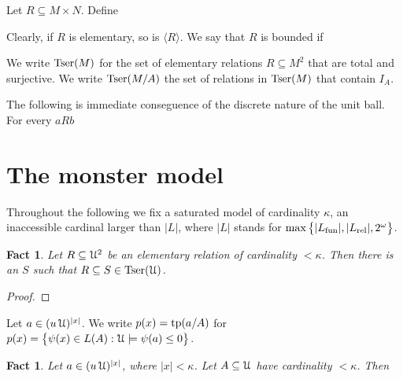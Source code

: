 \documentclass[12pt,letterpaper,oneside,reqno]{amsart}
\theoremstyle{plain}
\newtheorem{fact}[theorem]{Fact}
\theoremstyle{remark}
\renewcommand*{\emph}[1]{%
   \smash{\tikz[baseline]\node[rectangle, fill=olive!25, rounded corners, inner xsep=0.5ex, inner ysep=0.2ex, anchor=base, minimum height = 2.7ex]{#1};}}
\begin{document}
Let $R\subseteq M\times N$.
Define


Clearly, if $R$ is elementary, so is $\langle R\rangle$.
We say that $R$ is bounded if


We write ${\rm Tser}(M)$ for the set of elementary relations $R\subseteq M^2$ that are total and surjective.
We write  ${\rm Tser}(M/A)$ the set of relations in ${\rm Tser}(M)$ that contain $I_A$.

The following is immediate conseguence of the discrete nature of the unit ball.
For every $aRb$






\section{The monster model}

Throughout the following we fix a saturated model \emph{$\EuScript U$\/} of cardinality $\kappa$, an inaccessible cardinal larger than $|L|$, where $|L|$ stands for $\max\big\{|L_{\rm fun}|,|L_{\rm rel}|,2^\omega\big\}$.

\begin{fact}
  Let $R\subseteq{\EuScript U}^2$ be an elementary relation of cardinality $<\kappa$.
  Then there is an  $S$ such that $R\subseteq S\in{\rm Tser}({\EuScript U})$.
\end{fact}

\begin{proof}
  
\end{proof}

Let $a\in(u\,{\EuScript U})^{|x|}$. 
We write $p(x)={\rm tp}(a/A)$ for $p(x)=\big\{\psi(x)\in L(A):{\EuScript U}\models \psi(a)\le0\big\}$.


\begin{fact}
  Let $a\in(u\,{\EuScript U})^{|x|}$, where $|x|<\kappa$.
  Let $A\subseteq{\EuScript U}$ have cardinality $<\kappa$.
  Then

\end{fact}
\end{document}
